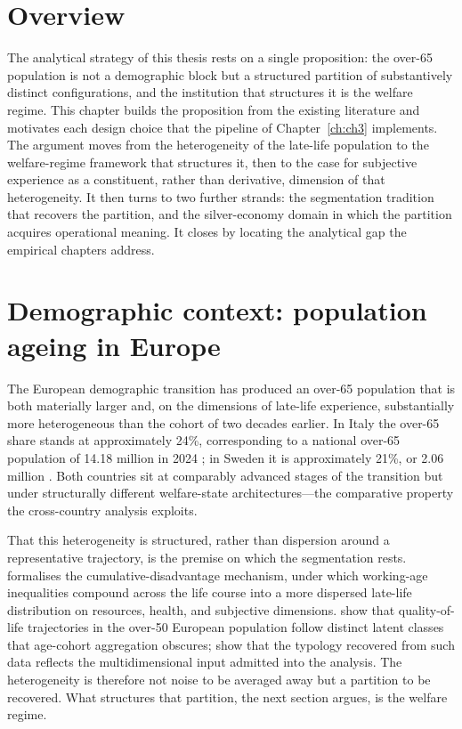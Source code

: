 \label{ch:ch2}

\section{Overview}
\label{sec:ch2-overview}

The analytical strategy of this thesis rests on a single proposition: the over-65 population is not a demographic block but a structured partition of substantively distinct configurations, and the institution that structures it is the welfare regime. This chapter builds the proposition from the existing literature and motivates each design choice that the pipeline of Chapter~\ref{ch:ch3} implements. The argument moves from the heterogeneity of the late-life population to the welfare-regime framework that structures it, then to the case for subjective experience as a constituent, rather than derivative, dimension of that heterogeneity. It then turns to two further strands: the segmentation tradition that recovers the partition, and the silver-economy domain in which the partition acquires operational meaning. It closes by locating the analytical gap the empirical chapters address.

\section{Demographic context: population ageing in Europe}
\label{sec:ch2-demographic}

The European demographic transition has produced an over-65 population that is both materially larger and, on the dimensions of late-life experience, substantially more heterogeneous than the cohort of two decades earlier. In Italy the over-65 share stands at approximately 24\%, corresponding to a national over-65 population of 14.18 million in 2024 \citep{istat2024}; in Sweden it is approximately 21\%, or 2.06 million \citep{scb2024}. Both countries sit at comparably advanced stages of the transition but under structurally different welfare-state architectures---the comparative property the cross-country analysis exploits.

That this heterogeneity is structured, rather than dispersion around a representative trajectory, is the premise on which the segmentation rests. \citet{dannefer2003} formalises the cumulative-disadvantage mechanism, under which working-age inequalities compound across the life course into a more dispersed late-life distribution on resources, health, and subjective dimensions. \citet{netuveli2008} show that quality-of-life trajectories in the over-50 European population follow distinct latent classes that age-cohort aggregation obscures; \citet{lestari2022} show that the typology recovered from such data reflects the multidimensional input admitted into the analysis. The heterogeneity is therefore not noise to be averaged away but a partition to be recovered. What structures that partition, the next section argues, is the welfare regime.

